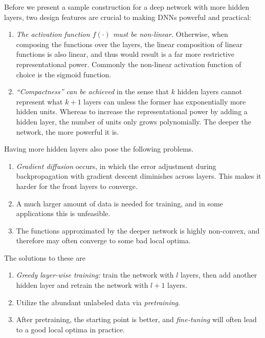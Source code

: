 \documentclass[12pt]{article}  %
\begin{document}
Before we present a sample construction for a deep network with more hidden layers, two design features are crucial to making DNNs powerful and practical:

\begin{enumerate}
	\item \emph{The activation function $f(\cdot)$ must be non-linear.} Otherwise, when composing the functions over the layers, the linear composition of linear functions is also linear, and thus would result is a far more restrictive representational power. Commonly the non-linear activation function of choice is the sigmoid function.
	\item \emph{``Compactness'' can be achieved} in the sense that $k$ hidden layers cannot represent what $k+1$ layers can unless the former has exponentially more hidden units. Whereas to increase the representational power by adding a hidden layer, the number of units only grows polynomially. The deeper the network, the more powerful it is.
\end{enumerate}


Having more hidden layers also pose the following problems.

\begin{enumerate}
	\item \emph{Gradient diffusion} occurs, in which the error adjustment during backpropagation with gradient descent diminishes across layers. This makes it harder for the front layers to converge.
	\item A much larger amount of data is needed for training, and in some applications this is unfeasible.
	\item The functions approximated by the deeper network is highly non-convex, and therefore may often converge to some bad local optima.
\end{enumerate}

The solutions to these are

\begin{enumerate}
	\item \emph{Greedy layer-wise training:} train the network with $l$ layers, then add another hidden layer and retrain the network with $l+1$ layers.
	\item Utilize the abundant unlabeled data via \emph{pretraining}.
	\item After pretraining, the starting point is better, and \emph{fine-tuning} will often lead to a good local optima in practice.
\end{enumerate}
\end{document}
